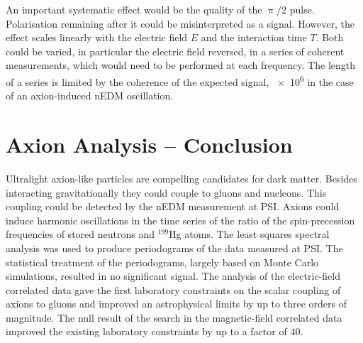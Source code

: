 An important systematic effect would be the quality of the $\uppi/2$ pulse.
Polarisation remaining after it could be misinterpreted as a signal.
However, the effect scales linearly with the electric field $E$ and the interaction time $T$.
Both could be varied, in particular the electric field reversed, in a series of coherent measurements, which would need to be performed at each frequency.
The length of a series is limited by the coherence of the expected signal, \num{e6} in the case of an axion-induced nEDM oscillation.




\section*{Axion Analysis -- Conclusion}
Ultralight axion-like particles are compelling candidates for dark matter.
Besides interacting gravitationally they could couple to gluons and nucleons.
This coupling could be detected by the nEDM measurement at PSI\@.
Axions could induce harmonic oscillations in the time series of the ratio of the spin-precession frequencies of stored neutrons and ${}^{199}$Hg atoms.
The least squares spectral analysis was used to produce periodograms of the data measured at PSI\@.
The statistical treatment of the periodograms, largely based on Monte Carlo simulations, resulted in no significant signal.
The analysis of the electric-field correlated data gave the first laboratory constraints on the scalar coupling of axions to gluons and improved an astrophysical limits by up to three orders of magnitude.
The null result of the search in the magnetic-field correlated data improved the existing laboratory constraints by up to a factor of 40.